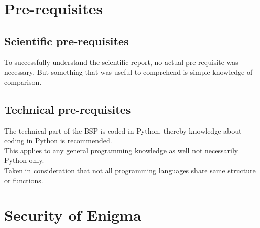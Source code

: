 \documentclass[conference,compsoc]{IEEEtran}
\begin{document}

\section{Pre-requisites}

\subsection{Scientific pre-requisites}
To successfully understand the scientific report, no actual pre-requisite was necessary.
But something that was useful to comprehend is simple knowledge of comparison.
\subsection{Technical pre-requisites}
The technical part of the BSP is coded in Python, thereby knowledge about coding in Python is recommended.\\
This applies to any general programming knowledge as well not necessarily Python only.\\
Taken in consideration that not all programming languages share same structure or functions.\\


\section{ Security of Enigma}
\label{sec-production}
\end{document}

